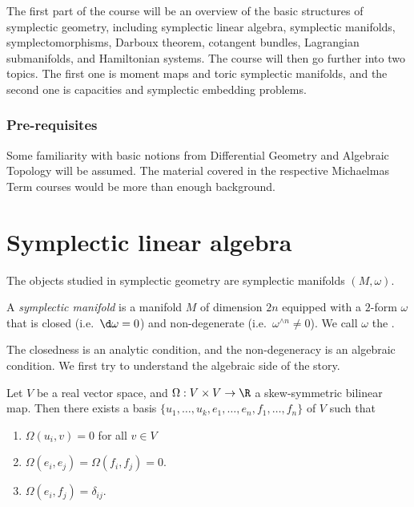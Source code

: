 \documentclass[a4paper]{article}
\begin{document}
\maketitle
{\small
\setlength{\parindent}{0em}
\setlength{\parskip}{1em}
The first part of the course will be an overview of the basic structures of symplectic geometry, including symplectic linear algebra, symplectic manifolds, symplectomorphisms, Darboux theorem, cotangent bundles, Lagrangian submanifolds, and Hamiltonian systems. The course will then go further into two topics. The first one is moment maps and toric symplectic manifolds, and the second one is capacities and symplectic embedding problems.

\subsubsection*{Pre-requisites}
Some familiarity with basic notions from Differential Geometry and Algebraic Topology will be assumed. The material covered in the respective Michaelmas Term courses would be more than enough background.
}
\tableofcontents
\section{Symplectic linear algebra}
The objects studied in symplectic geometry are symplectic manifolds $(M, \omega)$.
\begin{defi}
  A \emph{symplectic manifold} is a manifold $M$ of dimension $2n$ equipped with a $2$-form $\omega$ that is closed (i.e.\ $\d \omega = 0$) and non-degenerate (i.e.\ $\omega^{\wedge n} \not= 0$). We call $\omega$ the .
\end{defi}

The closedness is an analytic condition, and the non-degeneracy is an algebraic condition. We first try to understand the algebraic side of the story.

\begin{thm}
  Let $V$ be a real vector space, and $\Omega: V \times V \to \R$ a skew-symmetric bilinear map. Then there exists a basis $\{u_1, \ldots, u_k, e_1, \ldots, e_n, f_1, \ldots, f_n\}$ of $V$ such that
  \begin{enumerate}
    \item $\Omega(u_i, v) = 0$ for all $v \in V$
    \item $\Omega(e_i, e_j) = \Omega(f_i, f_j) = 0$.
    \item $\Omega(e_i, f_j) = \delta_{ij}$.
  \end{enumerate}
\end{thm}
\end{document}
